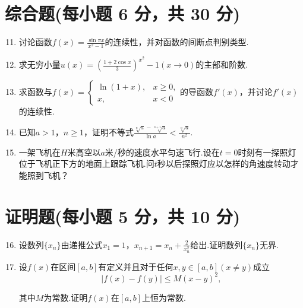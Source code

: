 \documentclass[../Main.tex]{subfiles}
\begin{document}
\section{综合题(每小题 6 分，共 30 分)}
\begin{enumerate}
    \setcounter{enumi}{10}
    \item 讨论函数$f(x)=\frac{\sin\pi x}{x^{2}-1}$的连续性，并对函数的间断点判别类型.
          \vspace{8em}

    \item 求无穷小量$u(x)=\left(\frac{1+2\cos x}{3}\right)^{x^2}-1(x\to0)$的主部和阶数.
          \vspace{8em}

    \item 求函数与$f(x)=
              \begin{cases}
                  \ln(1+x), & x\geq0, \\
                  x,        & x<0
              \end{cases}$的导函数$f'(x)$，并讨论$f'(x)$的连续性.
          \vspace{9em}

    \item 已知$a>1$，$n\geq1$，证明不等式$\frac{\sqrt[n]{a}-\sqrt[n+1]{a}}{\ln
                  a}<\frac{\sqrt[n]{a}}{n^{2}}$.
          \vspace{10em}

    \item 一架飞机在$H$米高空以$a$米/秒的速度水平匀速飞行.设在$t=0$时刻有一探照灯位于飞机正下方的地面上跟踪飞机.问$t$秒以后探照灯应以怎样的角速度转动才能照到飞机？
          \vspace{12em}
\end{enumerate}

\section{证明题(每小题 5 分，共 10 分)}
\begin{enumerate}
    \setcounter{enumi}{15}
    \item 设数列$\{x_{n}\}$由递推公式$x_{1}=1$，$x_{n+1}=x_{n}+\frac{2}{x_{n}^{2}}$给出.证明数列$\{
              x_{n}\}$无界.
          \vspace{12em}

    \item 设$f(x)$在区间$[a,b]$有定义并且对于任何$x,y\in[a,b](x\neq y)$成立
          \[
              |f(x)-f(y)|\leq M(x-y)^{2},
          \]

          其中$M$为常数.证明$f(x)$在$[a,b]$上恒为常数.
\end{enumerate}
\end{document}
